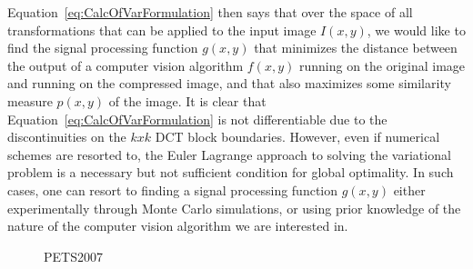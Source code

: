 \documentclass{article}
\begin{document}
\begin{itemize}
Equation~\ref{eq:CalcOfVarFormulation} then says that over the space of all transformations that can be applied to the input image $I(x,y)$, we would like to find the signal processing function $g(x,y)$ that minimizes the distance between the output of a computer vision algorithm $f(x,y)$ running on the original image and running on the compressed image, and that also maximizes some similarity measure $p(x,y)$ of the image.  It is clear that Equation~\ref{eq:CalcOfVarFormulation} is not differentiable due to the discontinuities on the $kxk$ DCT block boundaries.  However, even if numerical schemes are resorted to, the Euler Lagrange approach to solving the variational problem is a necessary but not sufficient condition for global optimality.  In such cases, one can resort to finding a signal processing function $g(x,y)$ either experimentally through Monte Carlo simulations, or using prior knowledge of the nature of the computer vision algorithm we are interested in.

\begin{figure}%
			\centering

			\caption{PETS2007}
			\label{fig:PicsPETS2007} 		
\end{figure}


\end{itemize}
\end{document}
